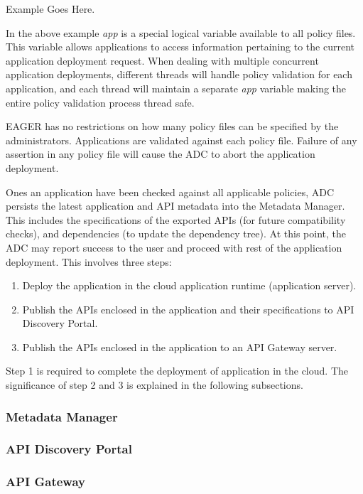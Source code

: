 Example Goes Here.

In the above example \textit{app} is a special logical variable available to all policy files. This variable allows applications to access information pertaining
to the current application deployment request. When dealing with multiple concurrent application deployments, different threads will handle policy validation
for each application, and each thread will maintain a separate \textit{app} variable making the entire policy validation process thread safe.

EAGER has no restrictions on how many policy files can be specified by the administrators. Applications are validated against each policy file. Failure of 
any assertion in any policy file will cause the ADC to abort the application deployment.

Ones an application have been checked against all applicable policies, ADC persists the latest application and API metadata into the Metadata Manager.
This includes the specifications of the exported APIs (for future compatibility checks), and dependencies (to update the dependency tree). At this point, the ADC
may report success to the user and proceed with rest of the application deployment. This involves three steps:

\begin{enumerate}
\item Deploy the application in the cloud application runtime (application server).
\item Publish the APIs enclosed in the application and their specifications to API Discovery Portal.
\item Publish the APIs enclosed in the application to an API Gateway server.
\end{enumerate}

Step 1 is required to complete the deployment of application in the cloud. The significance of step 2 and 3 is explained in the following subsections.

\subsubsection{Metadata Manager}
\subsubsection{API Discovery Portal}
\subsubsection{API Gateway}